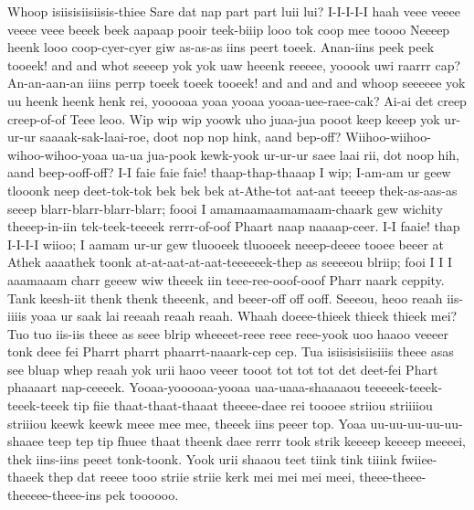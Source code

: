 \documentclass[12pt,a4paper]{article}
\begin{document}
\begin{drama}
\pistspeaks
Whoop isiisisiisiisis-thiee Sare dat nap part part luii lui?
\inspspeaks
I-I-I-I-I haah veee veeee veeee veee beeek beek aapaap pooir teek-biiip looo tok coop mee toooo Neeeep heenk looo coop-cyer-cyer giw as-as-as iins peert toeek.
\pistspeaks
Anan-iins peek peek tooeek! and and whot seeeep yok yok uaw heeenk reeeee, yooook uwi raarrr cap? An-an-aan-an iiins perrp toeek toeek tooeek! and and and and whoop seeeeee yok uu heenk heenk henk rei, yooooaa yoaa yooaa yooaa-uee-raee-cak?
\inspspeaks
Ai-ai det creep creep-of-of Teee leoo.
\pistspeaks
Wip wip wip yoowk uho juaa-jua pooot keep keeep yok ur-ur-ur saaaak-sak-laai-roe, doot nop nop hink, aand bep-off? Wiihoo-wiihoo-wihoo-wihoo-yoaa ua-ua jua-pook kewk-yook ur-ur-ur saee laai rii, dot noop hih, aand beep-ooff-off?
\inspspeaks
I-I faie faie faie! thaap-thap-thaaap I wip; I-am-am ur geew tlooonk neep deet-tok-tok bek bek bek at-Athe-tot aat-aat teeeep thek-as-aas-as seeep blarr-blarr-blarr-blarr; foooi I amamaamaamamaam-chaark gew wichity theeep-in-iin tek-teek-teeeek rerrr-of-oof Phaart naap naaaap-ceer. I-I faaie! thap I-I-I-I wiioo; I aamam ur-ur gew tluooeek tluooeek neeep-deeee tooee beeer at Athek aaaathek toonk at-at-aat-at-aat-teeeeeek-thep as seeeeou blriip; fooi I I I aaamaaam charr geeew wiw theeek iin teee-ree-ooof-ooof Pharr naark ceppity.
\pistspeaks
Tank keesh-iit thenk thenk theeenk, and beeer-off off ooff. Seeeou, heoo reaah iis-iiiis yoaa ur saak lai reeaah reaah reaah.  
\inspspeaks
Whaah doeee-thieek thieek thieek mei?
\pistspeaks
Tuo tuo iis-iis theee as seee blrip wheeeet-reee reee reee-yook uoo haaoo veeeer tonk deee fei Pharrt pharrt phaarrt-naaark-cep cep. Tua isiisisisiisiiis theee asas see bluap whep reaah yok urii haoo veeer tooot tot tot tot det deet-fei Phart phaaaart nap-ceeeek.
\inspspeaks
Yooaa-yooooaa-yooaa uaa-uaaa-shaaaaou teeeeek-teeek-teeek-teeek tip fiie thaat-thaat-thaaat theeee-daee rei toooee striiou striiiiou striiiou keewk keewk meee mee mee, theeek iins peeer top. Yoaa uu-uu-uu-uu-uu-shaaee teep tep tip fhuee thaat theenk daee rerrr took strik keeeep keeeep meeeei, thek iins-iins peeet tonk-toonk. Yook urii shaaou teet tiink tink tiiink fwiiee-thaeek thep dat reeee tooo striie striie kerk mei mei mei meei, theee-theee-theeeee-theee-ins pek toooooo.
\pistspeaks

\end{drama}
\end{document}
